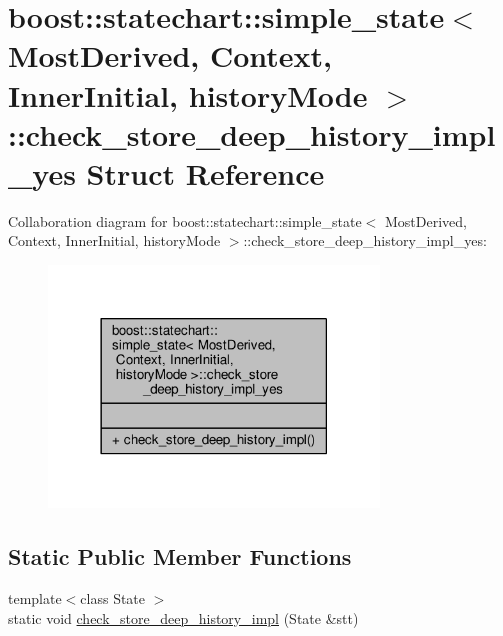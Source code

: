 \hypertarget{structboost_1_1statechart_1_1simple__state_1_1check__store__deep__history__impl__yes}{}\section{boost\+:\+:statechart\+:\+:simple\+\_\+state$<$ Most\+Derived, Context, Inner\+Initial, history\+Mode $>$\+:\+:check\+\_\+store\+\_\+deep\+\_\+history\+\_\+impl\+\_\+yes Struct Reference}
\label{structboost_1_1statechart_1_1simple__state_1_1check__store__deep__history__impl__yes}


Collaboration diagram for boost\+:\+:statechart\+:\+:simple\+\_\+state$<$ Most\+Derived, Context, Inner\+Initial, history\+Mode $>$\+:\+:check\+\_\+store\+\_\+deep\+\_\+history\+\_\+impl\+\_\+yes\+:
\nopagebreak
\begin{figure}[H]
\begin{center}
\leavevmode
\includegraphics[width=249pt]{structboost_1_1statechart_1_1simple__state_1_1check__store__deep__history__impl__yes__coll__graph}
\end{center}
\end{figure}
\subsection*{Static Public Member Functions}
\begin{DoxyCompactItemize}
\item 
{\footnotesize template$<$class State $>$ }\\static void \mbox{\hyperlink{structboost_1_1statechart_1_1simple__state_1_1check__store__deep__history__impl__yes_a627a06819055eb5f3888c5a69c8b916f}{check\+\_\+store\+\_\+deep\+\_\+history\+\_\+impl}} (State \&stt)
\end{DoxyCompactItemize}


